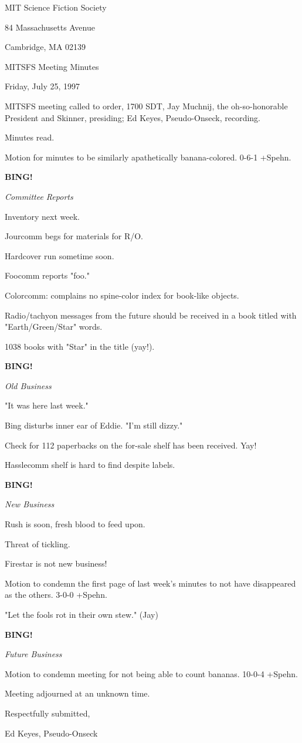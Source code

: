 \documentclass[12pt]{article}
\newcommand{\bing}{{\bf BING!} }
\newcommand{\goto}[1]{\bing \vskip 12pt \centerline{{\em{#1}}}}
\begin{document}
\begin{center}

MIT Science Fiction Society 

84 Massachusetts Avenue

Cambridge, MA 02139

\vspace{12pt}

MITSFS Meeting Minutes 

Friday, July 25, 1997

\end{center}
 
\vspace{18pt}

\setlength{\parskip}{6pt}

\noindent
MITSFS meeting called to order, 1700 SDT,
Jay Muchnij, the oh-so-honorable President and Skinner, presiding; Ed Keyes, Pseudo-Onseck, recording.

Minutes read.

Motion for minutes to be similarly apathetically banana-colored. 0-6-1 +Spehn.

\goto{Committee Reports}

Inventory next week.

Jourcomm begs for materials for R/O.

Hardcover run sometime soon.

Foocomm reports "foo."

Colorcomm: complains no spine-color index for book-like objects.

Radio/tachyon messages from the future should be received in a book titled with "Earth/Green/Star" words.

1038 books with "Star" in the title (yay!).

\goto{Old Business}

"It was here last week."

Bing disturbs inner ear of Eddie. "I'm still dizzy."

Check for 112 paperbacks on the for-sale shelf has been received. Yay!

Hasslecomm shelf is hard to find despite labels.

\goto{New Business}

Rush is soon, fresh blood to feed upon.

Threat of tickling.

Firestar is not new business!

Motion to condemn the first page of last week's minutes to not have disappeared as the others. 3-0-0 +Spehn.

"Let the fools rot in their own stew." (Jay)

\goto{Future Business}

Motion to condemn meeting for not being able to count bananas. 10-0-4 +Spehn.

\vspace{12pt}

\noindent
Meeting adjourned at an unknown time.

\vspace{18pt}

\centerline{Respectfully submitted,}
\centerline{Ed Keyes, Pseudo-Onseck}
\end{document}
